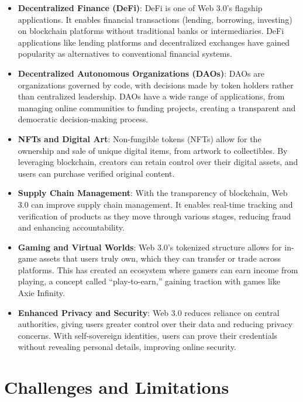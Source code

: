 \documentclass[12pt]{article}
\begin{document}
\begin{itemize}
    \item \textbf{Decentralized Finance (DeFi)}: DeFi is one of Web 3.0’s flagship applications. It enables financial transactions (lending, borrowing, investing) on blockchain platforms without traditional banks or intermediaries. DeFi applications like lending platforms and decentralized exchanges have gained popularity as alternatives to conventional financial systems.
    \item \textbf{Decentralized Autonomous Organizations (DAOs)}: DAOs are organizations governed by code, with decisions made by token holders rather than centralized leadership. DAOs have a wide range of applications, from managing online communities to funding projects, creating a transparent and democratic decision-making process.
    \item \textbf{NFTs and Digital Art}: Non-fungible tokens (NFTs) allow for the ownership and sale of unique digital items, from artwork to collectibles. By leveraging blockchain, creators can retain control over their digital assets, and users can purchase verified original content.
    \item \textbf{Supply Chain Management}: With the transparency of blockchain, Web 3.0 can improve supply chain management. It enables real-time tracking and verification of products as they move through various stages, reducing fraud and enhancing accountability.
    \item \textbf{Gaming and Virtual Worlds}: Web 3.0’s tokenized structure allows for in-game assets that users truly own, which they can transfer or trade across platforms. This has created an ecosystem where gamers can earn income from playing, a concept called “play-to-earn,” gaining traction with games like Axie Infinity.
    \item \textbf{Enhanced Privacy and Security}: Web 3.0 reduces reliance on central authorities, giving users greater control over their data and reducing privacy concerns. With self-sovereign identities, users can prove their credentials without revealing personal details, improving online security.
\end{itemize}

\section{Challenges and Limitations}
\end{document}
